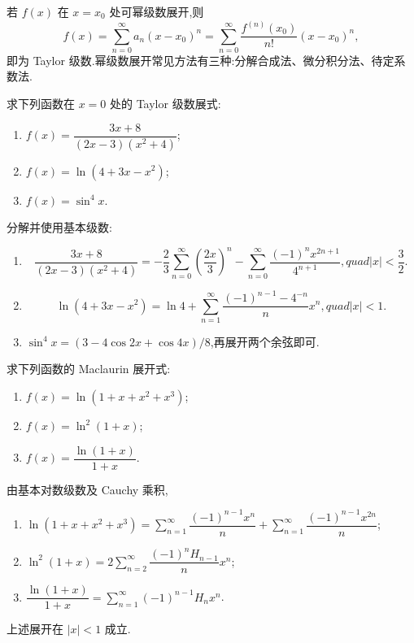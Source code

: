 \begin{remark}
    若 $f(x)$ 在 $x=x_0$ 处可幂级数展开,则
    \[
        f(x)=\sum\limits_{n=0}^{\infty}a_n(x-x_0)^n
        =\sum\limits_{n=0}^{\infty}\dfrac{f^{(n)}(x_0)}{n!}(x-x_0)^n,
    \]
    即为 Taylor 级数.幂级数展开常见方法有三种:分解合成法、微分积分法、待定系数法.
\end{remark}

\begin{example}
    求下列函数在 $x=0$ 处的 Taylor 级数展式:
    \begin{enumerate}
        \item $f(x)=\dfrac{3x+8}{(2x-3)(x^2+4)}$;
        \item $f(x)=\ln(4+3x-x^2)$;
        \item $f(x)=\sin^4x$.
    \end{enumerate}
\end{example}
\exampleblank

\begin{solution}
    分解并使用基本级数:
    \begin{enumerate}
        \item
              \[
                  \dfrac{3x+8}{(2x-3)(x^2+4)}
                  =-\dfrac{2}{3}\sum\limits_{n=0}^{\infty}\left(\dfrac{2x}{3}\right)^n
                  -\sum\limits_{n=0}^{\infty}\dfrac{(-1)^nx^{2n+1}}{4^{n+1}},quad |x|<\dfrac{3}{2}.
              \]
        \item
              \[
                  \ln(4+3x-x^2)=\ln4+\sum\limits_{n=1}^{\infty}
                  \dfrac{(-1)^{n-1}-4^{-n}}n x^n,quad |x|<1.
              \]
        \item $\displaystyle\sin^4x=(3-4\cos2x+\cos4x)/8$,再展开两个余弦即可.
    \end{enumerate}
\end{solution}

\begin{example}
    求下列函数的 Maclaurin 展开式:
    \begin{enumerate}
        \item $f(x)=\ln(1+x+x^2+x^3)$;
        \item $f(x)=\ln^2(1+x)$;
        \item $f(x)=\dfrac{\ln(1+x)}{1+x}$.
    \end{enumerate}
\end{example}
\exampleblank

\begin{solution}
    由基本对数级数及 Cauchy 乘积,
    \begin{enumerate}
        \item $\displaystyle\ln(1+x+x^2+x^3)=
                  \sum\limits_{n=1}^{\infty}\dfrac{(-1)^{n-1}x^n}{n}
                  +\sum\limits_{n=1}^{\infty}\dfrac{(-1)^{n-1}x^{2n}}n$;
        \item $\displaystyle\ln^2(1+x)=
                  2\sum\limits_{n=2}^{\infty}\dfrac{(-1)^nH_{n-1}}n x^n$;
        \item $\displaystyle\dfrac{\ln(1+x)}{1+x}=
                  \sum\limits_{n=1}^{\infty}(-1)^{n-1}H_nx^n$.
    \end{enumerate}
    上述展开在 $|x|<1$ 成立.
\end{solution}

